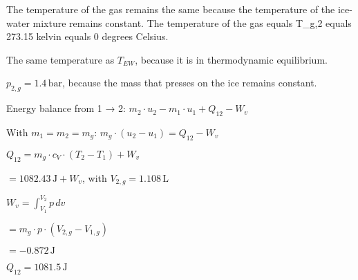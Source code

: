 The temperature of the gas remains the same because the temperature of the ice-water mixture remains constant.  
The temperature of the gas equals T_g,2 equals 273.15 kelvin equals 0 degrees Celsius.

The same temperature as \( T_{EW} \), because it is in thermodynamic equilibrium.  

\( p_{2,g} = 1.4 \, \text{bar} \), because the mass that presses on the ice remains constant.  

Energy balance from 1 → 2:  
\( m_2 \cdot u_2 - m_1 \cdot u_1 + Q_{12} - W_v \)  

With \( m_1 = m_2 = m_g \):  
\( m_g \cdot (u_2 - u_1) = Q_{12} - W_v \)  

\( Q_{12} = m_g \cdot c_V \cdot (T_2 - T_1) + W_v \)  

\( = 1082.43 \, \text{J} + W_v \), with \( V_{2,g} = 1.108 \, \text{L} \)  

\( W_v = \int_{V_1}^{V_2} p \, dv \)  

\( = m_g \cdot p \cdot (V_{2,g} - V_{1,g}) \)  

\( = -0.872 \, \text{J} \)  

\( Q_{12} = 1081.5 \, \text{J} \)